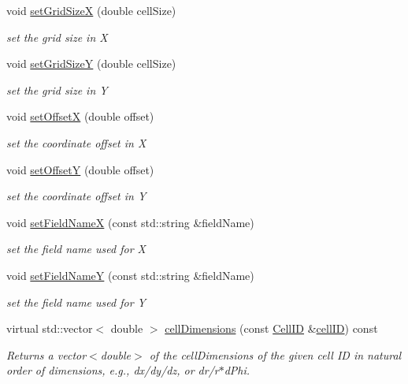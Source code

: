 \begin{DoxyCompactItemize}
void \hyperlink{class_d_d4hep_1_1_d_d_segmentation_1_1_cartesian_grid_x_y_af4955b8d0693a3ded3a6d14defec4c9e}{set\+Grid\+SizeX} (double cell\+Size)
\begin{DoxyCompactList}\small\item\em set the grid size in X \end{DoxyCompactList}\item 
void \hyperlink{class_d_d4hep_1_1_d_d_segmentation_1_1_cartesian_grid_x_y_ab824e8c12fa4314119994f7f54e134cf}{set\+Grid\+SizeY} (double cell\+Size)
\begin{DoxyCompactList}\small\item\em set the grid size in Y \end{DoxyCompactList}\item 
void \hyperlink{class_d_d4hep_1_1_d_d_segmentation_1_1_cartesian_grid_x_y_acc939312a216a3182eba69a024049663}{set\+OffsetX} (double offset)
\begin{DoxyCompactList}\small\item\em set the coordinate offset in X \end{DoxyCompactList}\item 
void \hyperlink{class_d_d4hep_1_1_d_d_segmentation_1_1_cartesian_grid_x_y_a0ce3cf2155283c1b45906709b37b07fc}{set\+OffsetY} (double offset)
\begin{DoxyCompactList}\small\item\em set the coordinate offset in Y \end{DoxyCompactList}\item 
void \hyperlink{class_d_d4hep_1_1_d_d_segmentation_1_1_cartesian_grid_x_y_a2f4cb5d0e804e2489ae2916c9eb3503d}{set\+Field\+NameX} (const std\+::string \&field\+Name)
\begin{DoxyCompactList}\small\item\em set the field name used for X \end{DoxyCompactList}\item 
void \hyperlink{class_d_d4hep_1_1_d_d_segmentation_1_1_cartesian_grid_x_y_a291b68b5ed0be43c141665b38aeeab52}{set\+Field\+NameY} (const std\+::string \&field\+Name)
\begin{DoxyCompactList}\small\item\em set the field name used for Y \end{DoxyCompactList}\item 
virtual std\+::vector$<$ double $>$ \hyperlink{class_d_d4hep_1_1_d_d_segmentation_1_1_cartesian_grid_x_y_a4e6684098e023a26f7f338190c394e0e}{cell\+Dimensions} (const \hyperlink{namespace_d_d4hep_1_1_d_d_segmentation_ac7af071d85cb48820914434a07e21ba1}{Cell\+ID} \&\hyperlink{class_d_d4hep_1_1_d_d_segmentation_1_1_cartesian_grid_x_y_a06e75589ebca4af45178854dc341b9c0}{cell\+ID}) const
\begin{DoxyCompactList}\small\item\em Returns a vector$<$double$>$ of the cell\+Dimensions of the given cell ID in natural order of dimensions, e.\+g., dx/dy/dz, or dr/r$\ast$d\+Phi. \end{DoxyCompactList}\end{DoxyCompactItemize}
